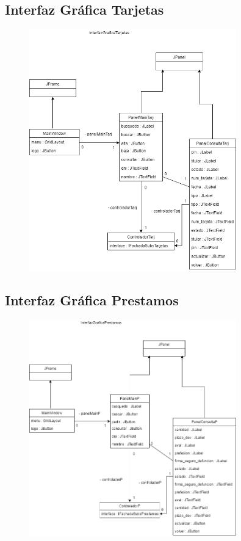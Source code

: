 \documentclass[12pt]{article}
\begin{document}
\subsection{Interfaz Gráfica Tarjetas}
\begin{figure}[H]
    \centering
    \includegraphics[width=0.8\textwidth]{images/IntefazGraficaTarjetas1.png}
\end{figure}

\subsection{Interfaz Gráfica Prestamos}
\begin{figure}[H]
    \centering
    \includegraphics[width=0.8\textwidth]{images/InterfazGraficaPrestamos_1.png}
\end{figure}
\end{document}
